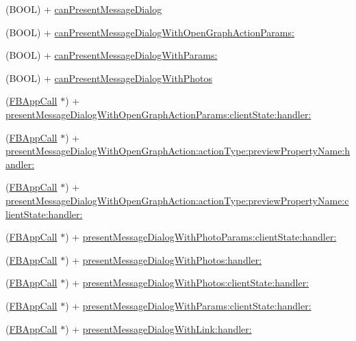 \begin{DoxyCompactItemize}
\item 
(B\+O\+OL) + \hyperlink{interfaceFBDialogs_aa41db27dd00b0c59e01d45f72b9045aa}{can\+Present\+Message\+Dialog}
\item 
(B\+O\+OL) + \hyperlink{interfaceFBDialogs_abc596dd117701ceb160dd63db514cf11}{can\+Present\+Message\+Dialog\+With\+Open\+Graph\+Action\+Params\+:}
\item 
(B\+O\+OL) + \hyperlink{interfaceFBDialogs_a81544299ca98179464ec34fc0e8d12b7}{can\+Present\+Message\+Dialog\+With\+Params\+:}
\item 
(B\+O\+OL) + \hyperlink{interfaceFBDialogs_ac10e310c30d763c7885c11fb44ac4924}{can\+Present\+Message\+Dialog\+With\+Photos}
\item 
(\hyperlink{interfaceFBAppCall}{F\+B\+App\+Call} $\ast$) + \hyperlink{interfaceFBDialogs_a5bca1ea62e067e9bdb417526be737bb7}{present\+Message\+Dialog\+With\+Open\+Graph\+Action\+Params\+:client\+State\+:handler\+:}
\item 
(\hyperlink{interfaceFBAppCall}{F\+B\+App\+Call} $\ast$) + \hyperlink{interfaceFBDialogs_a0f030b33a0565ec590e4abe56e147dc0}{present\+Message\+Dialog\+With\+Open\+Graph\+Action\+:action\+Type\+:preview\+Property\+Name\+:handler\+:}
\item 
(\hyperlink{interfaceFBAppCall}{F\+B\+App\+Call} $\ast$) + \hyperlink{interfaceFBDialogs_abcc422b112c828ff673681fbf4d7ccc1}{present\+Message\+Dialog\+With\+Open\+Graph\+Action\+:action\+Type\+:preview\+Property\+Name\+:client\+State\+:handler\+:}
\item 
(\hyperlink{interfaceFBAppCall}{F\+B\+App\+Call} $\ast$) + \hyperlink{interfaceFBDialogs_a4354b3266eb59fa77f04d88a4e6cda32}{present\+Message\+Dialog\+With\+Photo\+Params\+:client\+State\+:handler\+:}
\item 
(\hyperlink{interfaceFBAppCall}{F\+B\+App\+Call} $\ast$) + \hyperlink{interfaceFBDialogs_a47a8fb26e758e8b8da4843ce641a3fe6}{present\+Message\+Dialog\+With\+Photos\+:handler\+:}
\item 
(\hyperlink{interfaceFBAppCall}{F\+B\+App\+Call} $\ast$) + \hyperlink{interfaceFBDialogs_aa349cd5cb466439073782e084c422ca0}{present\+Message\+Dialog\+With\+Photos\+:client\+State\+:handler\+:}
\item 
(\hyperlink{interfaceFBAppCall}{F\+B\+App\+Call} $\ast$) + \hyperlink{interfaceFBDialogs_a09310f22ebc3ece7c91ee5bb47ccc4c6}{present\+Message\+Dialog\+With\+Params\+:client\+State\+:handler\+:}
\item 
(\hyperlink{interfaceFBAppCall}{F\+B\+App\+Call} $\ast$) + \hyperlink{interfaceFBDialogs_a33517c3089b65e7ce4c64c1c22c4e4af}{present\+Message\+Dialog\+With\+Link\+:handler\+:}

\end{DoxyCompactItemize}
